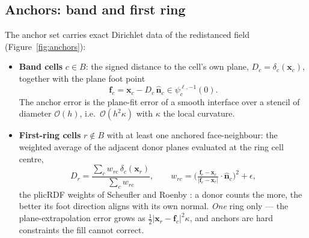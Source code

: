\documentclass[preprint,3p,11pt]{elsarticle}
\newcommand{\psilev}{\psi}
\newcommand{\xc}{\mathbf{x}_c}
\newcommand{\nhat}{\hat{\mathbf{n}}}
\begin{document}
\subsection{Anchors: band and first ring}
\label{sec:anchors}
The anchor set carries exact Dirichlet data of the redistanced field
(Figure~\ref{fig:anchors}):
\begin{itemize}
  \item \textbf{Band cells} $c \in B$: the signed distance to the cell's own
    plane, $D_c = \delta_c(\xc)$, together with the plane foot point
    \begin{equation}
      \mathbf{f}_c = \xc - D_c\,\nhat_c \in \psilev^{\ell,-1}_c(0).
      \label{eq:foot}
    \end{equation}
    The anchor error is the plane-fit error of a smooth interface over a
    stencil of diameter $\mathcal{O}(h)$, i.e.\
    $\mathcal{O}(h^2\kappa)$ with $\kappa$ the local curvature.
  \item \textbf{First-ring cells} $r \notin B$ with at least one anchored
    face-neighbour: the weighted average of the adjacent donor planes
    evaluated at the ring cell centre,
    \begin{equation}
      D_r = \frac{\sum_{c} w_{rc}\, \delta_c(\mathbf{x}_r)}
                 {\sum_{c} w_{rc}},
      \qquad
      w_{rc} = \Big(\tfrac{\mathbf{f}_c-\mathbf{x}_r}
                          {|\mathbf{f}_c-\mathbf{x}_r|}\cdot\nhat_c\Big)^2
               + \epsilon,
      \label{eq:ring}
    \end{equation}
    the plicRDF weights of Scheufler and Roenby \cite{scheufler2019}: a
    donor counts the more, the better its foot direction aligns with its own
    normal. \emph{One} ring only --- the plane-extrapolation error grows as
    $\tfrac{1}{2}|\mathbf{x}_r-\mathbf{f}_c|^2\kappa$, and anchors are hard
    constraints the fill cannot correct.
\end{itemize}
\end{document}
